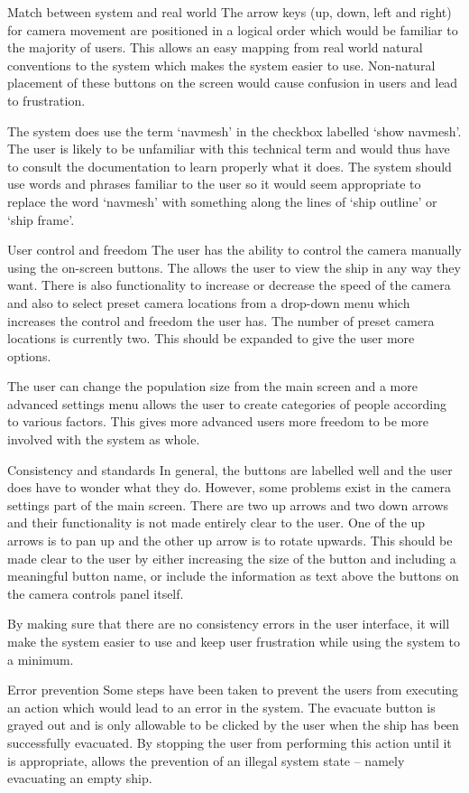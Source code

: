 \documentclass{article}
\begin{document}
Match between system and real world
The arrow keys (up, down, left and right) for camera movement are positioned in a logical order which would be familiar to the majority of users. This allows an easy mapping from real world natural conventions to the system which makes the system easier to use. Non-natural placement of these buttons on the screen would cause confusion in users and lead to frustration.

The system does use the term ‘navmesh’ in the checkbox labelled ‘show navmesh’. The user is likely to be unfamiliar with this technical term and would thus have to consult the documentation to learn properly what it does. The system should use words and phrases familiar to the user so it would seem appropriate to replace the word ‘navmesh’ with something along the lines of ‘ship outline’ or ‘ship frame’.

User control and freedom
The user has the ability to control the camera manually using the on-screen buttons. The allows the user to view the ship in any way they want. There is also functionality to increase or decrease the speed of the camera and also to select preset camera locations from a drop-down menu which increases the control and freedom the user has. The number of preset camera locations is currently two. This should be expanded to give the user more options.

The user can change the population size from the main screen and a more advanced settings menu allows the user to create categories of people according to various factors. This gives more advanced users more freedom to be more involved with the system as whole.


Consistency and standards
In general, the buttons are labelled well and the user does have to wonder what they do. However, some problems exist in the camera settings part of the main screen. There are two up arrows and two down arrows and their functionality is not made entirely clear to the user. One of the up arrows is to pan up and the other up arrow is to rotate upwards. This should be made clear to the user by either increasing the size of the button and including a meaningful button name, or include the information as text above the buttons on the camera controls panel itself.

By making sure that there are no consistency errors in the user interface, it will make the system easier to use and keep user frustration while using the system to a minimum.

Error prevention
Some steps have been taken to prevent the users from executing an action which would lead to an error in the system. The evacuate button is grayed out and is only allowable to be clicked by the user when the ship has been successfully evacuated. By stopping the user from performing this action until it is appropriate, allows the prevention of an illegal system state -- namely evacuating an empty ship.
\end{document}
